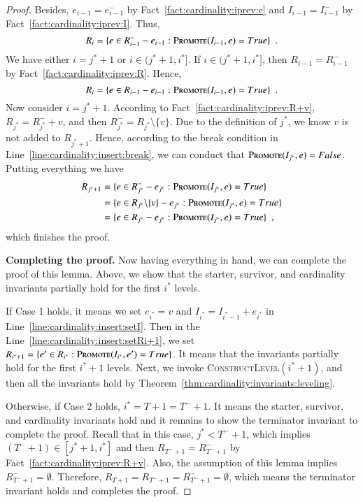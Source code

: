 \documentclass[11pt]{article}
\newcommand{\constLevel}{\textsc{ConstructLevel}}
\newcommand{\replacementTester}{\textsc{Promote}}
\begin{document}
\begin{proof}
Besides, $e_{i-1}=e_{i-1}^-$ by Fact~\ref{fact:cardinality:iprev:e} and $I_{i-1}=I_{i-1}^-$ by Fact~\ref{fact:cardinality:iprev:I}. Thus,
$$
    R_i
    = \{ e \in R_{i-1}^- - e_{i-1}: \replacementTester{}(I_{i-1}, e) = True\} \enspace .
$$
We have either $i=j^*+1$ or $i\in (j^*+1, i^*]$. If $i\in (j^*+1, i^*]$, then $R_{i - 1}=R_{i - 1}^-$ by Fact~\ref{fact:cardinality:iprev:R}. Hence,
$$
    R_i
    = \{ e \in R_{i-1} - e_{i-1}: \replacementTester{}(I_{i-1}, e) = True\} \enspace .
$$
Now consider $i=j^*+1$. According to Fact~\ref{fact:cardinality:iprev:R+v}, $R_{j^*}=R_{j^*}^-+v$, and then $R_{j^*}^-=R_{j^*}\setminus\{v\}$. Due to the definition of $j^*$, we know $v$ is not added to $R_{j^*+1}$. Hence, according to the break condition in Line~\ref{line:cardinality:insert:break}, we can conduct that  $\replacementTester{}(I_{j^*}, e) = False$. 
Putting everything we have
\begin{align*}
    R_{j^*+1} &= \{ e \in R_{j^*}^- - e_{j^*}: \replacementTester{}(I_{j^*}, e) = True\} \\
     &= \{ e \in R_{j^*} \backslash \{v\} - e_{j^*}: \replacementTester{}(I_{j^*}, e) = True\} \\
    &= \{ e \in R_{j^*} - e_{j^*}: \replacementTester{}(I_{j^*}, e) = True\} \enspace ,
\end{align*}
which finishes the proof.

\textbf{Completing the proof.}
Now having everything in hand, we can complete the proof of this lemma. Above, we show that the starter, survivor, and cardinality invariants partially hold for the first $i^*$ levels.

If Case 1 holds, it means we set $e_{i^*}=v$ and
$I_{i^*} = I_{i^*-1} + e_{i^*}$ in Line~\ref{line:cardinality:insert:setI}.
Then in the Line~\ref{line:cardinality:insert:setRi+1},
we set $R_{i^*+1} = \{e' \in R_{i^*}: \replacementTester{}(I_{i^*}, e') = True \}$.
It means that the invariants partially hold for the first $i^*+1$ levels.
Next, we invoke \constLevel$(i^*+1)$, and then all the invariants hold by Theorem~\ref{thm:cardinality:invariants:leveling}. 

Otherwise, if Case 2 holds, $i^*=T+1=T^-+1$.
It means the starter,  survivor, and cardinality invariants hold and it remains to show the terminator invariant to complete the proof.
Recall that in this case, $j^*<T^-+1$, which implies $(T^-+1)\in[j^*+1, i^*]$ and then $R_{T^-+1}=R_{T^-+1}^-$ by Fact~\ref{fact:cardinality:iprev:R+v}.
Also, the assumption of this lemma implies $R_{T^-+1}^-=\emptyset$.  Therefore,
$R_{T+1}=R_{T^-+1}=R_{T^-+1}^-=\emptyset$, which means the terminator invariant holds and completes the proof.

\end{proof}
\end{document}
